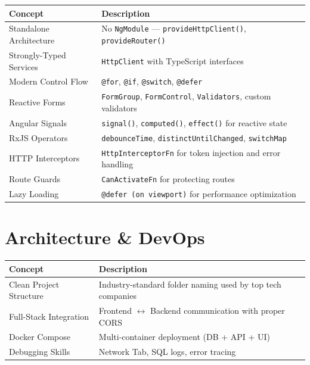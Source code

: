 \documentclass[12pt,a4paper]{report}
\begin{document}
\begin{longtable}{p{4.5cm}p{9cm}}
\toprule
\textbf{Concept} & \textbf{Description} \\
\midrule
\endhead
Standalone Architecture & No \texttt{NgModule} --- \texttt{provideHttpClient()}, \texttt{provideRouter()} \\[0.3cm]
Strongly-Typed Services & \texttt{HttpClient} with TypeScript interfaces \\[0.3cm]
Modern Control Flow & \texttt{@for}, \texttt{@if}, \texttt{@switch}, \texttt{@defer} \\[0.3cm]
Reactive Forms & \texttt{FormGroup}, \texttt{FormControl}, \texttt{Validators}, custom validators \\[0.3cm]
Angular Signals & \texttt{signal()}, \texttt{computed()}, \texttt{effect()} for reactive state \\[0.3cm]
RxJS Operators & \texttt{debounceTime}, \texttt{distinctUntilChanged}, \texttt{switchMap} \\[0.3cm]
HTTP Interceptors & \texttt{HttpInterceptorFn} for token injection and error handling \\[0.3cm]
Route Guards & \texttt{CanActivateFn} for protecting routes \\[0.3cm]
Lazy Loading & \texttt{@defer (on viewport)} for performance optimization \\
\bottomrule
\end{longtable}

\section{Architecture \& DevOps}

\begin{longtable}{p{4.5cm}p{9cm}}
\toprule
\textbf{Concept} & \textbf{Description} \\
\midrule
\endhead
Clean Project Structure & Industry-standard folder naming used by top tech companies \\[0.3cm]
Full-Stack Integration & Frontend $\leftrightarrow$ Backend communication with proper CORS \\[0.3cm]
Docker Compose & Multi-container deployment (DB + API + UI) \\[0.3cm]
Debugging Skills & Network Tab, SQL logs, error tracing \\
\bottomrule
\end{longtable}

\end{document}
